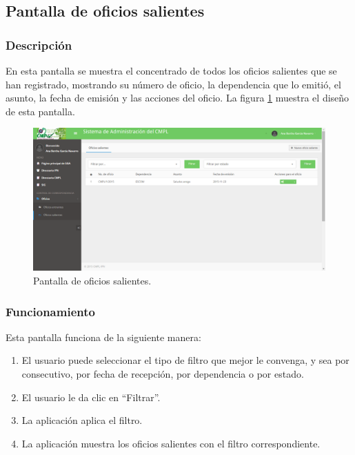 \subsection{Pantalla de oficios salientes}
\subsubsection{Descripción}
	En esta pantalla se muestra el concentrado de todos los oficios salientes que se han registrado, mostrando su número de oficio, la dependencia que lo emitió, el asunto, la fecha de emisión y las acciones del oficio. La figura \ref{fig:OficiosSalientes} muestra el diseño de esta pantalla.			
		
	\begin{figure}[htbp!]
		\centering
			\includegraphics[width=1\textwidth]{Pantallas/OficiosSalientes.png}
		\caption{Pantalla de oficios salientes.}
		\label{fig:OficiosSalientes}
	\end{figure}

\subsubsection{Funcionamiento}
	Esta pantalla funciona de la siguiente manera:
	
	\begin{enumerate}
		\item El usuario puede seleccionar el tipo de filtro que mejor le convenga, y sea por consecutivo, por fecha de recepción, por dependencia o por estado.
		\item El usuario le da clic en ``Filtrar''.
		\item La aplicación aplica el filtro.
		\item La aplicación muestra los oficios salientes con el filtro correspondiente.
	\end{enumerate}

